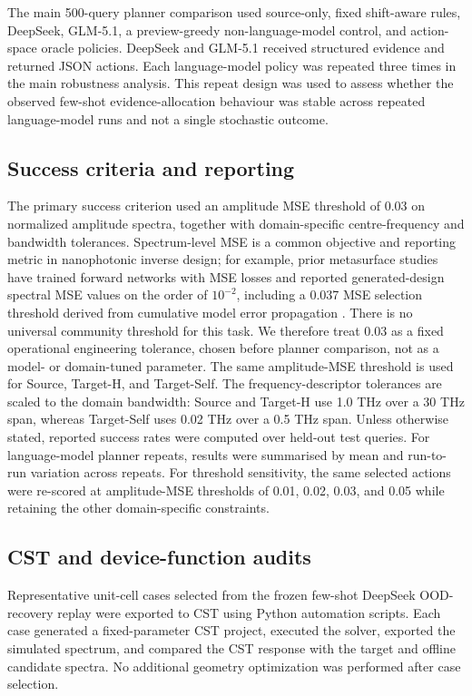 \documentclass[final,1p,times]{elsarticle}
\begin{document}
The main 500-query planner comparison used source-only, fixed shift-aware rules, DeepSeek, GLM-5.1, a preview-greedy non-language-model control, and action-space oracle policies. DeepSeek and GLM-5.1 received structured evidence and returned JSON actions. Each language-model policy was repeated three times in the main robustness analysis. This repeat design was used to assess whether the observed few-shot evidence-allocation behaviour was stable across repeated language-model runs and not a single stochastic outcome.

\subsection{Success criteria and reporting}

The primary success criterion used an amplitude MSE threshold of 0.03 on normalized amplitude spectra, together with domain-specific centre-frequency and bandwidth tolerances. Spectrum-level MSE is a common objective and reporting metric in nanophotonic inverse design; for example, prior metasurface studies have trained forward networks with MSE losses and reported generated-design spectral MSE values on the order of $10^{-2}$, including a 0.037 MSE selection threshold derived from cumulative model error propagation \cite{mall2020cyclical,chen2025tunable}. There is no universal community threshold for this task. We therefore treat 0.03 as a fixed operational engineering tolerance, chosen before planner comparison, not as a model- or domain-tuned parameter. The same amplitude-MSE threshold is used for Source, Target-H, and Target-Self. The frequency-descriptor tolerances are scaled to the domain bandwidth: Source and Target-H use 1.0 THz over a 30 THz span, whereas Target-Self uses 0.02 THz over a 0.5 THz span. Unless otherwise stated, reported success rates were computed over held-out test queries. For language-model planner repeats, results were summarised by mean and run-to-run variation across repeats. For threshold sensitivity, the same selected actions were re-scored at amplitude-MSE thresholds of 0.01, 0.02, 0.03, and 0.05 while retaining the other domain-specific constraints.

\subsection{CST and device-function audits}

Representative unit-cell cases selected from the frozen few-shot DeepSeek OOD-recovery replay were exported to CST using Python automation scripts. Each case generated a fixed-parameter CST project, executed the solver, exported the simulated spectrum, and compared the CST response with the target and offline candidate spectra. No additional geometry optimization was performed after case selection.
\end{document}
